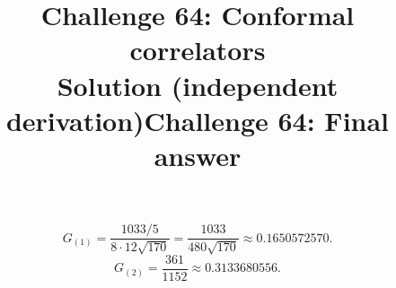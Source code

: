 \documentclass[11pt]{article}
\title{Challenge 64: Conformal correlators \\ \large Solution (independent derivation)}
\date{}
\title{Challenge 64: Final answer}
\author{}
\begin{document}
\maketitle
\begin{equation}
G_{(1)}=\frac{1033/5}{8\cdot12\sqrt{170}}=\frac{1033}{480\sqrt{170}}\approx0.1650572570 .
\end{equation}
\begin{equation}
G_{(2)}=\frac{361}{1152}\approx0.3133680556 .
\end{equation}
\end{document}
